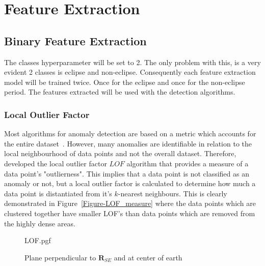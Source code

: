 \chapter{Feature Extraction}
\label{chap:Feature Extraction}


\section{Binary Feature Extraction}
The classes hyperparameter will be set to 2. The only problem with this, is a very evident 2 classes is eclipse and non-eclipse. Consequently each feature extraction model will be trained twice. Once for the eclipse and once for the non-eclipse period. The features extracted will be used with the detection algorithms.

\subsection{Local Outlier Factor}
Most algorithms for anomaly detection are based on a metric which accounts for the entire dataset~\cite{breunig2000lof}. However, many anomalies are identifiable in relation to the local neighbourhood of data points and not the overall dataset. Therefore, \cite{breunig2000lof} developed the local outlier factor \(LOF\) algorithm that provides a measure of a data point's "outlierness". This implies that a data point is not classified as an anomaly or not, but a local outlier factor is calculated to determine how much a data point is distantiated from it's $k$-nearest neighbours. This is clearly demonstrated in Figure~\ref{Figure-LOF_measure} where the data points which are clustered together have smaller LOF's than data points which are removed from the highly dense areas.

\begin{figure}[!hbt]
	\centering
	{LOF.pgf}
	\caption{Plane perpendicular to $\mathbf{R}_{SE}$ and at center of earth}
	\label{fig:localOutlierFactor}
\end{figure}

